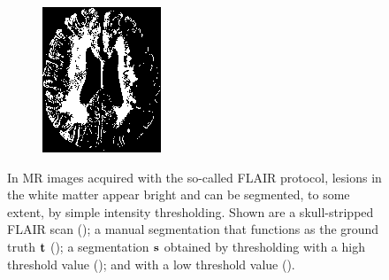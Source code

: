 \documentclass[10pt,twoside]{book}
\begin{document}
\begin{figure}
\begin{subfigure}{0.32\textwidth}
    \caption{}
    \label{fig:whiteMatterHyperIntensities_c}
  \end{subfigure}
  \begin{subfigure}{0.32\textwidth}
    \centering
    \includegraphics[width=\textwidth]{segmentationLowThreshold}
    \caption{}
    \label{fig:whiteMatterHyperIntensities_d}
  \end{subfigure}
  \caption{In MR images acquired with the so-called FLAIR protocol, lesions in the white matter appear bright and can be segmented, to some extent, by simple intensity thresholding. 
           Shown are a skull-stripped FLAIR scan (); a manual segmentation that functions as the ground truth $\mathbf{t}$ (); a segmentation $\mathbf{s}$ obtained by thresholding with 
           a high threshold value (); and with a low threshold value ().}
  \label{fig:whiteMatterHyperIntensities}
\end{figure}
\end{document}
